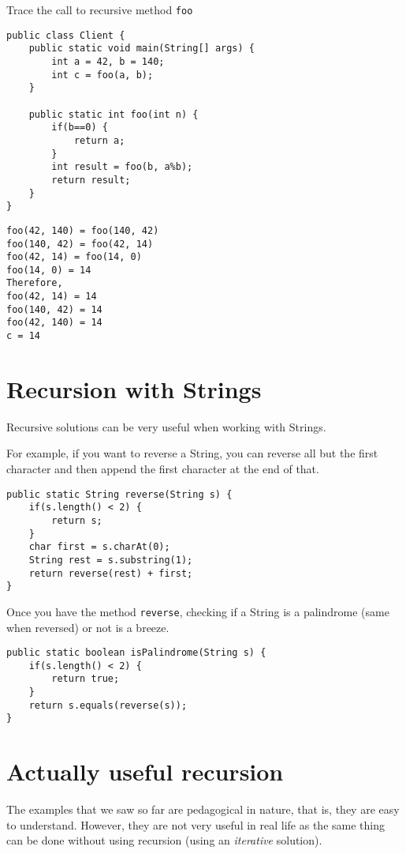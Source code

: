 \newpage

\begin{exercise}[6]
Trace the call to recursive method \texttt{foo}

\begin{lstlisting}
public class Client {
	public static void main(String[] args) {
		int a = 42, b = 140;
		int c = foo(a, b);
	}
	
	public static int foo(int n) {
		if(b==0) {
			return a;
		}
		int result = foo(b, a%b);
		return result;
	}
}
\end{lstlisting}
\end{exercise}
\begin{answer}
\begin{verbatim}
foo(42, 140) = foo(140, 42)
foo(140, 42) = foo(42, 14)
foo(42, 14) = foo(14, 0)
foo(14, 0) = 14
Therefore,
foo(42, 14) = 14
foo(140, 42) = 14
foo(42, 140) = 14
c = 14
\end{verbatim}
\end{answer}

\section{Recursion with Strings}

Recursive solutions can be very useful when working with Strings.

For example, if you want to reverse a String, you can reverse all but the first character and then append the first character at the end of that.

\begin{lstlisting}
public static String reverse(String s) {
	if(s.length() < 2) {
		return s;
	}
	char first = s.charAt(0);
	String rest = s.substring(1);
	return reverse(rest) + first;
}
\end{lstlisting}

Once you have the method \texttt{reverse}, checking if a String is a palindrome (same when reversed) or not is a breeze.

\begin{lstlisting}
public static boolean isPalindrome(String s) {
	if(s.length() < 2) {
		return true;
	}
	return s.equals(reverse(s));
}
\end{lstlisting}
\section{Actually useful recursion}

The examples that we saw so far are pedagogical in nature, that is, they are easy to understand. However, they are not very useful in real life as the same thing can be done without using recursion (using an \textit{iterative} solution).

